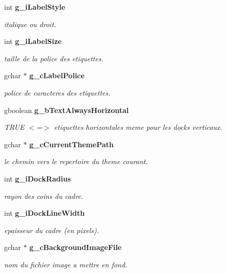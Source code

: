 \begin{CompactItemize}
int {\bf g\_\-i\-Label\-Style}
\begin{CompactList}\small\item\em italique ou droit. \item\end{CompactList}\item 
int {\bf g\_\-i\-Label\-Size}
\begin{CompactList}\small\item\em taille de la police des etiquettes. \item\end{CompactList}\item 
gchar $\ast$ {\bf g\_\-c\-Label\-Police}
\begin{CompactList}\small\item\em police de caracteres des etiquettes. \item\end{CompactList}\item 
gboolean {\bf g\_\-b\-Text\-Always\-Horizontal}
\begin{CompactList}\small\item\em TRUE $<$=$>$ etiquettes horizontales meme pour les docks verticaux. \item\end{CompactList}\item 
gchar $\ast$ {\bf g\_\-c\-Current\-Theme\-Path}
\begin{CompactList}\small\item\em le chemin vers le repertoire du theme courant. \item\end{CompactList}\item 
int {\bf g\_\-i\-Dock\-Radius}
\begin{CompactList}\small\item\em rayon des coins du cadre. \item\end{CompactList}\item 
int {\bf g\_\-i\-Dock\-Line\-Width}
\begin{CompactList}\small\item\em epaisseur du cadre (en pixels). \item\end{CompactList}\item 
gchar $\ast$ {\bf g\_\-c\-Background\-Image\-File}
\begin{CompactList}\small\item\em nom du fichier image a mettre en fond. \item\end{CompactList}\item 

\end{CompactItemize}
